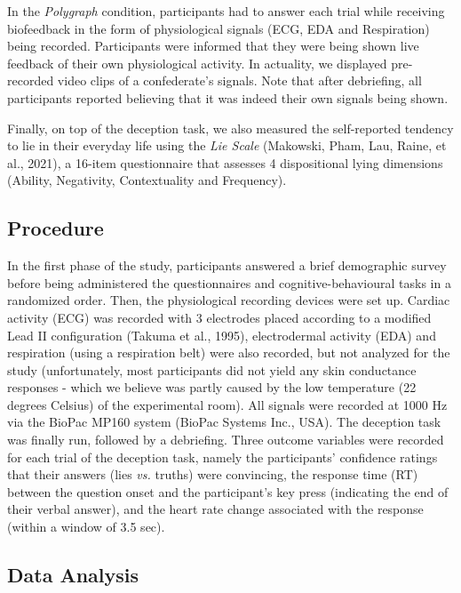 \documentclass[
  man,floatsintext]{apa6}
\begin{document}
In the \emph{Polygraph} condition, participants had to answer each trial while receiving biofeedback in the form of physiological signals (ECG, EDA and Respiration) being recorded. Participants were informed that they were being shown live feedback of their own physiological activity. In actuality, we displayed pre-recorded video clips of a confederate's signals. Note that after debriefing, all participants reported believing that it was indeed their own signals being shown.

Finally, on top of the deception task, we also measured the self-reported tendency to lie in their everyday life using the \emph{Lie Scale} (Makowski, Pham, Lau, Raine, et al., 2021), a 16-item questionnaire that assesses 4 dispositional lying dimensions (Ability, Negativity, Contextuality and Frequency).

\hypertarget{procedure}{%
\subsection{Procedure}\label{procedure}}

In the first phase of the study, participants answered a brief demographic survey before being administered the questionnaires and cognitive-behavioural tasks in a randomized order. Then, the physiological recording devices were set up. Cardiac activity (ECG) was recorded with 3 electrodes placed according to a modified Lead II configuration (Takuma et al., 1995), electrodermal activity (EDA) and respiration (using a respiration belt) were also recorded, but not analyzed for the study (unfortunately, most participants did not yield any skin conductance responses - which we believe was partly caused by the low temperature (22 degrees Celsius) of the experimental room). All signals were recorded at 1000 Hz via the BioPac MP160 system (BioPac Systems Inc., USA). The deception task was finally run, followed by a debriefing. Three outcome variables were recorded for each trial of the deception task, namely the participants' confidence ratings that their answers (lies \emph{vs.} truths) were convincing, the response time (RT) between the question onset and the participant's key press (indicating the end of their verbal answer), and the heart rate change associated with the response (within a window of 3.5 sec).

\hypertarget{data-analysis}{%
\subsection{Data Analysis}\label{data-analysis}}
\end{document}
